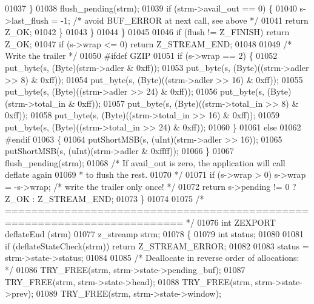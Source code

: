 \begin{DoxyCode}
{01037             \}
01038             flush\_pending(strm);
01039             \textcolor{keywordflow}{if} (strm->avail\_out == 0) \{
01040               s->last\_flush = -1; \textcolor{comment}{/* avoid BUF\_ERROR at next call, see above */}
01041               \textcolor{keywordflow}{return} Z\_OK;
01042             \}
01043         \}
01044     \}
01045 
01046     \textcolor{keywordflow}{if} (flush != Z\_FINISH) \textcolor{keywordflow}{return} Z\_OK;
01047     \textcolor{keywordflow}{if} (s->wrap <= 0) \textcolor{keywordflow}{return} Z\_STREAM\_END;
01048 
01049     \textcolor{comment}{/* Write the trailer */}
01050 \textcolor{preprocessor}{#ifdef GZIP}
01051     \textcolor{keywordflow}{if} (s->wrap == 2) \{
01052         put\_byte(s, (Byte)(strm->adler & 0xff));
01053         put\_byte(s, (Byte)((strm->adler >> 8) & 0xff));
01054         put\_byte(s, (Byte)((strm->adler >> 16) & 0xff));
01055         put\_byte(s, (Byte)((strm->adler >> 24) & 0xff));
01056         put\_byte(s, (Byte)(strm->total\_in & 0xff));
01057         put\_byte(s, (Byte)((strm->total\_in >> 8) & 0xff));
01058         put\_byte(s, (Byte)((strm->total\_in >> 16) & 0xff));
01059         put\_byte(s, (Byte)((strm->total\_in >> 24) & 0xff));
01060     \}
01061     \textcolor{keywordflow}{else}
01062 \textcolor{preprocessor}{#endif}
01063     \{
01064         putShortMSB(s, (uInt)(strm->adler >> 16));
01065         putShortMSB(s, (uInt)(strm->adler & 0xffff));
01066     \}
01067     flush\_pending(strm);
01068     \textcolor{comment}{/* If avail\_out is zero, the application will call deflate again}
01069 \textcolor{comment}{     * to flush the rest.}
01070 \textcolor{comment}{     */}
01071     \textcolor{keywordflow}{if} (s->wrap > 0) s->wrap = -s->wrap; \textcolor{comment}{/* write the trailer only once! */}
01072     \textcolor{keywordflow}{return} s->pending != 0 ? Z\_OK : Z\_STREAM\_END;
01073 \}
01074 
01075 \textcolor{comment}{/* ========================================================================= */}
01076 \textcolor{keywordtype}{int} ZEXPORT deflateEnd (strm)
01077     z\_streamp strm;
01078 \{
01079     \textcolor{keywordtype}{int} status;
01080 
01081     \textcolor{keywordflow}{if} (deflateStateCheck(strm)) \textcolor{keywordflow}{return} Z\_STREAM\_ERROR;
01082 
01083     status = strm->state->status;
01084 
01085     \textcolor{comment}{/* Deallocate in reverse order of allocations: */}
01086     TRY\_FREE(strm, strm->state->pending\_buf);
01087     TRY\_FREE(strm, strm->state->head);
01088     TRY\_FREE(strm, strm->state->prev);
01089     TRY\_FREE(strm, strm->state->window);
}
\end{DoxyCode}
